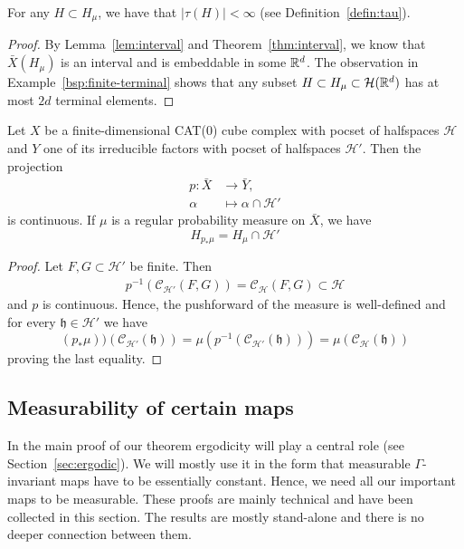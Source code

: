 \begin{lemma}
  \label{lem:finite-terminal}
  For any \(H \subset H_\mu\), we have that \(|\tau(H)| < \infty\) (see Definition~\ref{defin:tau}).
\end{lemma}

\begin{proof}
  By Lemma~\ref{lem:interval} and Theorem~\ref{thm:interval}, we know that \(\bar X(H_\mu)\) is an interval and is embeddable in some \(\mathbb{R}^d\). The observation in Example~\ref{bsp:finite-terminal} shows that any subset \(H \subset H_\mu \subset \mathcal{H}(\mathbb{R}^d)\) has at most \(2d\) terminal elements.
\end{proof}

\begin{lemma}
  \label{lem:proj-weight}
  Let \(X\) be a finite-dimensional CAT(0) cube complex with pocset of halfspaces \(\mathcal{H}\) and \(Y\) one of its irreducible factors with pocset of halfspaces \(\mathcal{H}'\). Then the projection
  \begin{align*}
    p\colon \bar X & \to \bar Y,\\
    \alpha & \mapsto \alpha \cap \mathcal{H}'
  \end{align*}
  is continuous. If \(\mu\) is a regular probability measure on \(\bar X\), we have
  \[
    H_{p_\ast \mu} = H_\mu \cap \mathcal{H}'
  \]
\end{lemma}

\begin{proof}
  Let \(F, G \subset \mathcal{H}'\) be finite. Then
  \begin{align*}
    p^{-1}(\mathcal{C_{\mathcal{H}'}}(F,G)) = \mathcal{C_{\mathcal{H}}}(F,G) \subset \mathcal{H}
  \end{align*}
  and \(p\) is continuous. Hence, the pushforward of the measure is well-defined and for every \(\mathfrak{h} \in \mathcal{H}'\) we have
  \[
    (p_\ast \mu))(\mathcal{C}_{\mathcal{H}'}(\mathfrak{h})) = \mu(p^{-1}(\mathcal{C}_{\mathcal{H}'}(\mathfrak{h}))) = \mu(\mathcal{C}_{\mathcal{H}}(\mathfrak{h}))
  \]
  proving the last equality.
\end{proof}

\subsection{Measurability of certain maps}
\label{sec:meas-maps}

In the main proof of our theorem ergodicity will play a central role (see Section~\ref{sec:ergodic}). We will mostly use it in the form that measurable \(\Gamma\)-invariant maps have to be essentially constant. Hence, we need all our important maps to be measurable. These proofs are mainly technical and have been collected in this section. The results are mostly stand-alone and there is no deeper connection between them.

